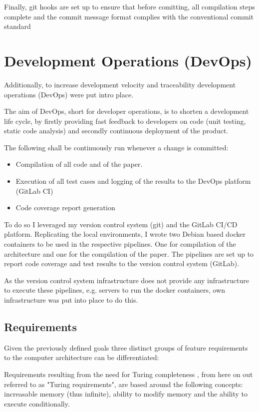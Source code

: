 Finally, git hooks are set up to ensure that before comitting, all compilation steps complete and the commit message format complies with the conventional commit standard \cite{conventionalcommit}

\section{Development Operations (DevOps)}
Additionally, to increase development velocity and traceability development operations (DevOps) were put intro place. 

The aim of DevOps, short for developer operations, is to shorten a development life cycle, by firstly providing fast feedback to developers on code (unit testing, static code analysis) and secondly continuous deployment of the product. 


The following shall be continuously run whenever a change is committed:  

\begin{itemize}
  \item Compilation of all code and of the paper.  
  \item Execution of all test cases and logging of the results to the DevOps platform (GitLab CI)
  \item Code coverage report generation
\end{itemize}

To do so I leveraged my version control system (git) and the GitLab CI/CD platform. Replicating the local environments, I wrote two Debian based docker containers \cite{dockerVerilator} \cite{dockerLatex} to be used in the respective pipelines. One for compilation of the architecture and one for the compilation of the paper. The pipelines are set up to report code coverage and test results to the version control system (GitLab). 

As the version control system infrastructure does not provide any infrastructure to execute these pipelines, e.g. servers to run the docker containers, own infrastructure was put into place to do this.

\subsection{Requirements}
Given the previously defined goals three distinct groups of feature requirements to the computer architecture can be differentiated: 

Requirements resulting from the need for Turing completeness \cite{turing1936a}, from here on out referred to as "Turing requirements", are based around the following concepts: increasable memory (thus infinite), ability to modify memory and the ability to execute conditionally. 

